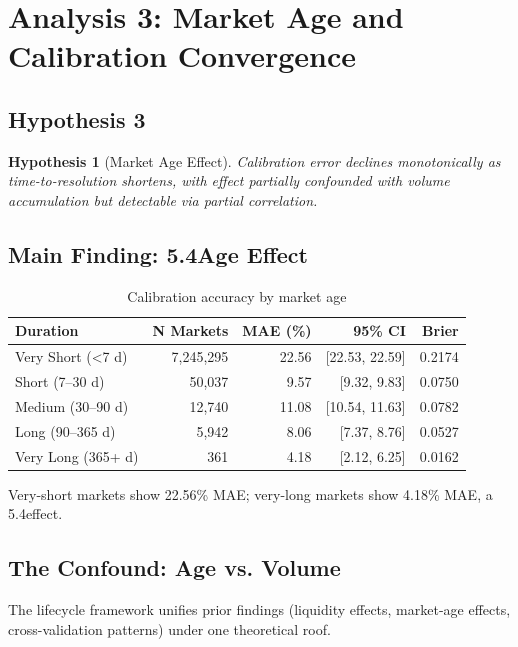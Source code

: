 \documentclass[a4paper,11pt]{article}
\theoremstyle{plain}
\newtheorem{hypothesis}[section]{Hypothesis}
\theoremstyle{definition}
\begin{document}
\section{Analysis 3: Market Age and Calibration Convergence}
\label{sec:analysis3}

\subsection{Hypothesis 3}

\begin{hypothesis}[Market Age Effect]
Calibration error declines monotonically as time-to-resolution shortens, with effect partially confounded with volume accumulation but detectable via partial correlation.
\end{hypothesis}

\subsection{Main Finding: 5.4\times Age Effect}

\begin{table}[h]
\centering
\caption{Calibration accuracy by market age}
\label{tab:age_cohorts}
\small
\begin{tabular}{lrrrr}
\toprule
Duration & N Markets & MAE (\%) & 95\% CI & Brier \\
\midrule
Very Short (<7 d) & 7,245,295 & 22.56 & [22.53, 22.59] & 0.2174 \\
Short (7--30 d) & 50,037 & 9.57 & [9.32, 9.83] & 0.0750 \\
Medium (30--90 d) & 12,740 & 11.08 & [10.54, 11.63] & 0.0782 \\
Long (90--365 d) & 5,942 & 8.06 & [7.37, 8.76] & 0.0527 \\
Very Long (365+ d) & 361 & 4.18 & [2.12, 6.25] & 0.0162 \\
\bottomrule
\end{tabular}
\end{table}

Very-short markets show 22.56\% MAE; very-long markets show 4.18\% MAE, a 5.4\times effect.

\subsection{The Confound: Age vs. Volume}

The lifecycle framework unifies prior findings (liquidity effects, market-age effects, cross-validation patterns) under one theoretical roof.
\end{document}
